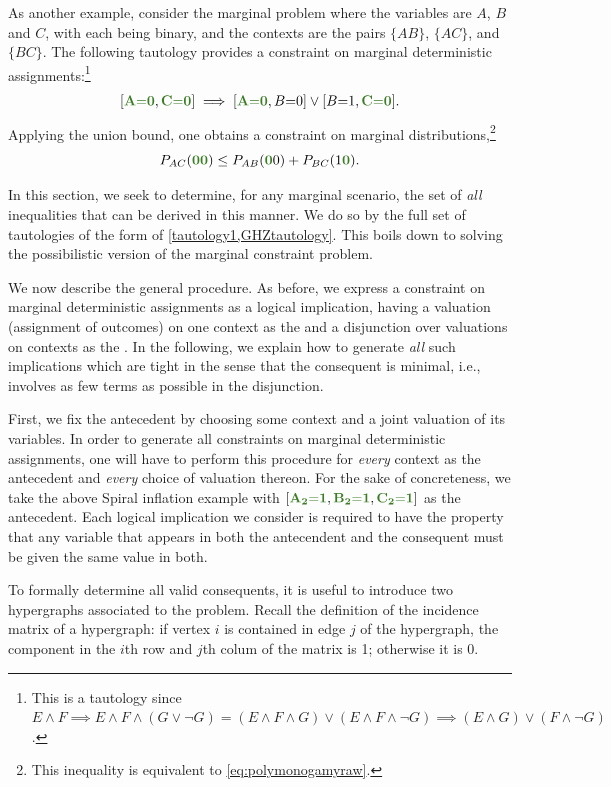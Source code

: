 \documentclass[aps,english,10pt,superscriptaddress,onecolumn,twoside,longbibliography,pra,floatfix,fleqn,nofootinbib]{revtex4-1}
\newcommand*{\mgreen}[1]{{\color{OliveGreen}{\mathbf{#1}}}}
\newcommand*{\tblue}[1]{{\color{MidnightBlue}{\textbf{#1}}}}
\theoremstyle{definition}
\newcounter{example}[section]
\newcommand{\eql}{\mathord{=}}
\DeclarePairedDelimiter{\bracks}{\lbrack}{\rbrack}
\begin{document}
As another example, consider the marginal problem where the variables are $A$, $B$ and $C$, with each being binary, and the contexts are the pairs $\{AB\}$, $\{AC\}$, and $\{BC\}$.  
The following tautology provides a constraint on marginal deterministic assignments:\footnote{This is a tautology since $E \land F  \implies  E \land F \land (G \lor \lnot G) = (E \land F \land G) \lor (E\land F \land \lnot G) \implies (E \land G) \lor (F \land \lnot G)$.}
\begin{align}\label{GHZtautology}
 \bracks{\mgreen{A \eql 0}, \mgreen{C \eql 0}} \implies \bracks{\mgreen{A \eql 0}, B \eql 0} \lor \bracks{B \eql 1, \mgreen{C \eql 0}}.
\end{align}
Applying the union bound, one obtains a constraint on marginal distributions,\footnote{This inequality is equivalent to \cref{eq:polymonogamyraw}.}
\[
P_{AC}(\mgreen{0 0}) \leq P_{AB}(\mgreen{0} 0) + P_{BC}(1 \mgreen{0}).
\]

In this section, we seek to determine, for any marginal scenario, the set of \emph{all} inequalities that can be derived in this manner.  We do so by \tblue{enumerating} the full set of tautologies of the form of \cref{tautology1,GHZtautology}. This boils down to solving the possibilistic version of the marginal constraint problem.

We now describe the general procedure. As before, we express a constraint on marginal deterministic assignments as a logical implication, having a valuation (assignment of outcomes) on one context as the \tblue{antecedent} and a disjunction over valuations on contexts as the \tblue{consequent}. In the following, we explain how to generate \emph{all} such implications which are tight in the sense that the consequent is minimal, i.e., involves as few terms as possible in the disjunction. 

First, we fix the antecedent by choosing some context and a joint valuation of its variables. In order to generate all constraints on marginal deterministic assignments, one will have to perform this procedure for \emph{every} context as the antecedent and \emph{every} choice of valuation thereon. For the sake of concreteness, we take the above Spiral inflation example with $\bracks{\mgreen{A_2 \eql 1}, \mgreen{B_2 \eql 1}, \mgreen{C_2 \eql 1}}$ as the antecedent.  
Each logical implication we consider is required to have the property that any variable that appears in both the antecendent and the consequent must be given the same value in both. 

To formally determine all valid consequents, it is useful to introduce two hypergraphs associated to the problem.  Recall the definition of the incidence  matrix of a hypergraph: if vertex $i$ is contained in edge $j$ of the hypergraph, the component in the $i$th row and $j$th colum of the matrix  is 1; otherwise it is 0.  
\end{document}
